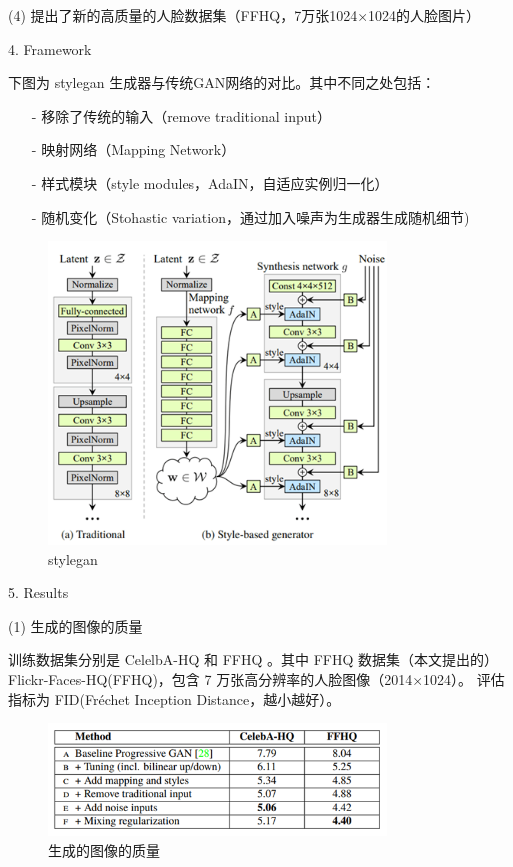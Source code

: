 (4) 提出了新的高质量的人脸数据集（FFHQ，7万张1024×1024的人脸图片）

4. Framework

下图为 stylegan 生成器与传统GAN网络的对比。其中不同之处包括：

\begin{enumerate}
 \item [-] 移除了传统的输入（remove traditional input）
 \item [-] 映射网络（Mapping Network）
 \item [-] 样式模块（style modules，AdaIN，自适应实例归一化）
 \item [-] 随机变化（Stohastic variation，通过加入噪声为生成器生成随机细节)
\end{enumerate}

\begin{figure}[htb]
\centering 
\includegraphics[width=0.8\textwidth]{img/m2t9.png} 
\caption{stylegan}
\label{Test}
\end{figure}

5. Results

(1) 生成的图像的质量

训练数据集分别是 CelelbA-HQ 和 FFHQ 。其中 FFHQ 数据集（本文提出的）Flickr-Faces-HQ(FFHQ)，包含 7 万张高分辨率的人脸图像（2014×1024）。
评估指标为 FID(Fréchet Inception Distance，越小越好）。

\begin{figure}[htb]
\centering 
\includegraphics[width=0.8\textwidth]{img/m2t10.png} 
\caption{生成的图像的质量}
\label{Test}
\end{figure}

